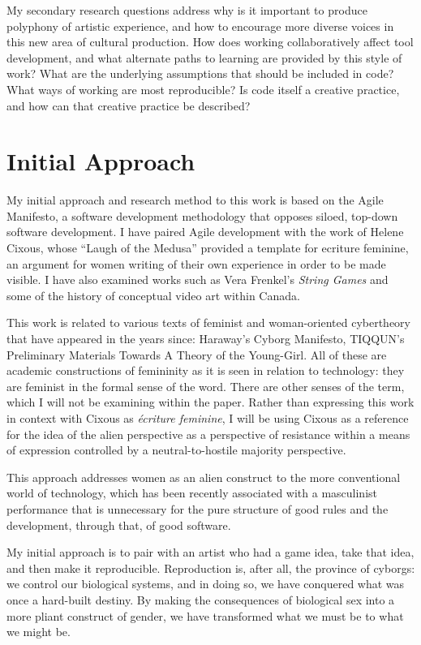 My secondary research questions address why is it important to produce polyphony of artistic experience, and how to encourage more diverse voices in this new area of cultural production. How does working collaboratively affect tool development, and what alternate paths to learning are provided by this style of work? What are the underlying assumptions that should be included in code? What ways of working are most reproducible? Is code itself a creative practice, and how can that creative practice be described?


\section{Initial Approach}
My initial approach and research method to this work is based on the Agile Manifesto, a software development methodology that opposes siloed, top-down software development. I have paired Agile development with the work of Helene Cixous, whose “Laugh of the Medusa” provided a template for ecriture feminine, an argument for women writing of their own experience in order to be made visible. I have also examined works such as Vera Frenkel's \textit{String Games} and some of the history of conceptual video art within Canada. 

This work is related to various texts of feminist and woman-oriented cybertheory that have appeared in the years since: Haraway’s Cyborg Manifesto, TIQQUN’s Preliminary Materials Towards A Theory of the Young-Girl. All of these are academic constructions of femininity as it is seen in relation to technology: they are feminist in the formal sense of the word. There are other senses of the term, which I will not be examining within the paper. Rather than expressing this work in context with Cixous as \textit{écriture feminine}, I will be using Cixous as a reference for the idea of the alien perspective as a perspective of resistance within a means of expression controlled by a neutral-to-hostile majority perspective. 

This approach addresses women as an alien construct to the more conventional world of technology, which has been recently associated with a masculinist performance that is unnecessary for the pure structure of good rules and the development, through that, of good software. 

My initial approach is to pair with an artist who had a game idea, take that idea, and then make it reproducible. Reproduction is, after all, the province of cyborgs: we control our biological systems, and in doing so, we have conquered what was once a hard-built destiny. By making the consequences of biological sex into a more pliant construct of gender, we have transformed what we must be to what we might be.

